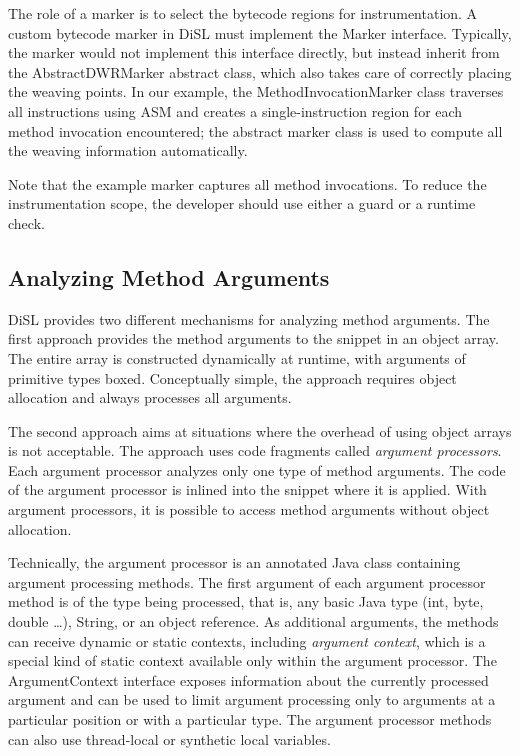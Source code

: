 \documentclass{article}
\newcommand{\brcode}[1]{\textsf{#1}}
\newcommand{\code}[1]{\mbox{\brcode{#1}}}
\begin{document}
The role of a marker is to select the bytecode regions for instrumentation.
A custom bytecode marker in DiSL must implement the \code{Marker} interface.
Typically, the marker would not implement this interface directly, but instead inherit from the \code{AbstractDWRMarker} abstract class, which also takes care of correctly placing the weaving points.
In our example, the \code{MethodInvocationMarker} class traverses all instructions using ASM and creates a single-instruction region for each method invocation encountered; the abstract marker class is used to compute all the weaving information automatically.

Note that the example marker captures all method invocations.
To reduce the instrumentation scope, the developer should use either a guard or a runtime check.


\subsection{Analyzing Method Arguments}

DiSL provides two different mechanisms for analyzing method arguments.
The first approach provides the method arguments to the snippet in an object array.
The entire array is constructed dynamically at runtime, with arguments of primitive types boxed.
Conceptually simple, the approach requires object allocation and always processes all arguments.

The second approach aims at situations where the overhead of using object arrays is not acceptable.
The approach uses code fragments called \emph{argument processors}.
Each argument processor analyzes only one type of method arguments.
The code of the argument processor is inlined into the snippet where it is applied.
With argument processors, it is possible to access method arguments without object allocation.

Technically, the argument processor is an annotated Java class containing argument processing methods.
The first argument of each argument processor method is of the type being processed, that is, any basic Java type (\code{int}, \code{byte}, \code{double} \ldots), \code{String}, or an object reference.
As additional arguments, the methods can receive dynamic or static contexts, including \emph{argument context}, which is a special kind of static context  available only within the argument processor.
The \code{ArgumentContext} interface exposes information about the currently processed argument and can be used to limit argument processing only to arguments at a particular position or with a particular type.
The argument processor methods can also use thread-local or synthetic local variables.
\end{document}
